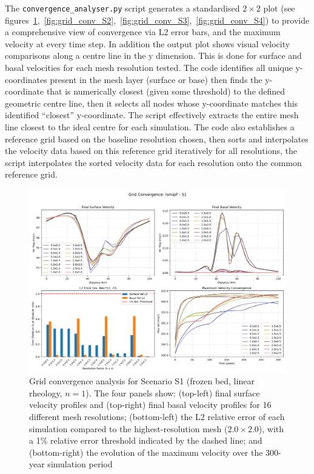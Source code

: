 The \texttt{convergence\_analyser.py} script generates a standardised $2\times2$ plot (see figures~\ref{fig:grid_conv_S1},~\ref{fig:grid_conv_S2},~\ref{fig:grid_conv_S3},~\ref{fig:grid_conv_S4}) to provide a comprehensive view of convergence via L2 error bars, and the maximum velocity at every time step. In addition the output plot shows visual velocity comparisons along a centre line in the y dimension. This is done for surface and basal velocities for each mesh resolution tested. The code identifies all unique y-coordinates present in the mesh layer (surface or base) then finds the y-coordinate that is numerically closest (given some threshold) to the defined geometric centre line, then it selects all nodes whose y-coordinate matches this identified ``closest'' y-coordinate. The script effectively extracts the entire mesh line closest to the ideal centre for each simulation. The code also establishes a reference grid based on the baseline resolution chosen, then sorts and interpolates the velocity data based on this reference grid iteratively for all resolutions, the script interpolates the sorted velocity data for each resolution onto the common reference grid. 
\begin{figure}[H]
    \includegraphics[scale=0.40]{figures/IsmipF_S1_convergence_summary.png}
    \caption{Grid convergence analysis for Scenario S1 (frozen bed, linear rheology, $n=1$). The four panels show: (top-left) final surface velocity profiles and (top-right) final basal velocity profiles for 16 different mesh resolutions; (bottom-left) the L2 relative error of each simulation compared to the highest-resolution mesh ($2.0\times2.0$), with a 1\% relative error threshold indicated by the dashed line; and (bottom-right) the evolution of the maximum velocity over the 300-year simulation period}
    \label{fig:grid_conv_S1}
\end{figure}

